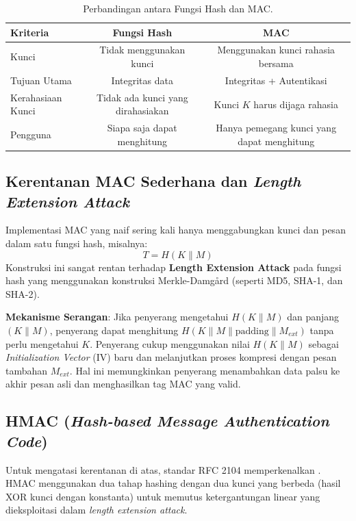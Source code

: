 \begin{table}[htbp]
  \centering
  \small
  \begin{tabular}{lcc}
    \toprule
    \textbf{Kriteria} & \textbf{Fungsi Hash} & \textbf{MAC} \\
    \midrule
    Kunci & Tidak menggunakan kunci & Menggunakan kunci rahasia bersama \\
    Tujuan Utama & Integritas data & Integritas + Autentikasi \\
    Kerahasiaan Kunci & Tidak ada kunci yang dirahasiakan & Kunci $K$ harus dijaga rahasia \\
    Pengguna & Siapa saja dapat menghitung & Hanya pemegang kunci yang dapat menghitung \\
    \bottomrule
  \end{tabular}
  \caption{Perbandingan antara Fungsi Hash dan MAC.}
  \label{tab:hash-vs-mac}
\end{table}

\subsection{Kerentanan MAC Sederhana dan \textit{Length Extension Attack}}

Implementasi MAC yang naif sering kali hanya menggabungkan kunci dan pesan dalam satu fungsi hash, misalnya:
\begin{equation}
  T = H(K \parallel M)
\end{equation}
Konstruksi ini sangat rentan terhadap \textbf{Length Extension Attack} pada fungsi hash yang menggunakan konstruksi Merkle-Damgård (seperti MD5, SHA-1, dan SHA-2).

\textbf{Mekanisme Serangan}:
Jika penyerang mengetahui $H(K \parallel M)$ dan panjang $(K \parallel M)$, penyerang dapat menghitung $H(K \parallel M \parallel \text{padding} \parallel M_{ext})$ tanpa perlu mengetahui $K$. Penyerang cukup menggunakan nilai $H(K \parallel M)$ sebagai \textit{Initialization Vector} (IV) baru dan melanjutkan proses kompresi dengan pesan tambahan $M_{ext}$. Hal ini memungkinkan penyerang menambahkan data palsu ke akhir pesan asli dan menghasilkan tag MAC yang valid.

\subsection{HMAC (\textit{Hash-based Message Authentication Code})}

Untuk mengatasi kerentanan di atas, standar RFC 2104 memperkenalkan . HMAC menggunakan dua tahap hashing dengan dua kunci yang berbeda (hasil XOR kunci dengan konstanta) untuk memutus ketergantungan linear yang dieksploitasi dalam \textit{length extension attack}.

